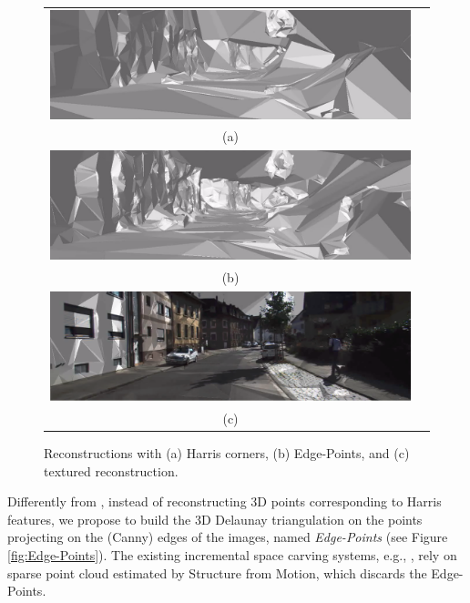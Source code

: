 \begin{figure}[tp]
\centering
\begin{tabular}{cc}
\includegraphics[width=0.98\columnwidth]{./img//reconstrHarris}\\
(a)\\
\includegraphics[width=0.98\columnwidth]{./img//reconstr}\\
(b)\\
\includegraphics[width=0.98\columnwidth]{./img//reconstrTex}\\
(c)\\
\end{tabular}
\caption{Reconstructions with (a) Harris corners, (b) Edge-Points, and (c) textured reconstruction.}
\label{fig:recons}
\end{figure}


Differently from \cite{litvinov_lhuillier_13}, instead of reconstructing 3D points corresponding to Harris features, we propose to build the 3D Delaunay triangulation on the points projecting on the (Canny) edges of the images, named \emph{Edge-Points} (see Figure \ref{fig:Edge-Points}). 
The existing incremental space carving systems, e.g., \cite{litvinov_Lhiuller14, litvinov_lhuillier_13, lovi_et_al_11}, rely on sparse point cloud estimated by Structure from Motion, which discards the Edge-Points.

